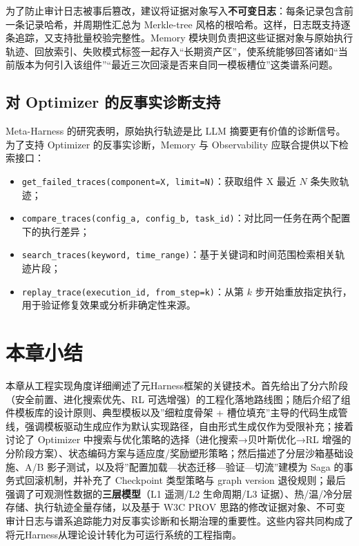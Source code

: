 为了防止审计日志被事后篡改，建议将证据对象写入\textbf{不可变日志}：每条记录包含前一条记录哈希，并周期性汇总为 Merkle-tree 风格的根哈希。这样，日志既支持逐条追踪，又支持批量校验完整性。Memory 模块则负责把这些证据对象与原始执行轨迹、回放索引、失败模式标签一起存入“长期资产区”，使系统能够回答诸如“当前版本为何引入该组件”“最近三次回滚是否来自同一模板槽位”这类谱系问题。

\subsection{对 Optimizer 的反事实诊断支持}

Meta-Harness 的研究表明，原始执行轨迹是比 LLM 摘要更有价值的诊断信号。为了支持 Optimizer 的反事实诊断，Memory 与 Observability 应联合提供以下检索接口：
\begin{itemize}
    \item \texttt{get\_failed\_traces(component=X, limit=N)}：获取组件 X 最近 $N$ 条失败轨迹；
    \item \texttt{compare\_traces(config\_a, config\_b, task\_id)}：对比同一任务在两个配置下的执行差异；
    \item \texttt{search\_traces(keyword, time\_range)}：基于关键词和时间范围检索相关轨迹片段；
    \item \texttt{replay\_trace(execution\_id, from\_step=k)}：从第 $k$ 步开始重放指定执行，用于验证修复效果或分析非确定性来源。
\end{itemize}

\section{本章小结}

本章从工程实现角度详细阐述了元Harness框架的关键技术。首先给出了分六阶段（安全前置、进化搜索优先、RL 可选增强）的工程化落地路线图；随后介绍了组件模板库的设计原则、典型模板以及”细粒度骨架 + 槽位填充”主导的代码生成管线，强调模板驱动生成应作为默认实现路径，自由形式生成仅作为受限补充；接着讨论了 Optimizer 中搜索与优化策略的选择（进化搜索→贝叶斯优化→RL 增强的分阶段方案）、状态编码方案与适应度/奖励塑形策略；然后描述了分层沙箱基础设施、A/B 影子测试，以及将”配置加载—状态迁移—验证—切流”建模为 Saga 的事务式回滚机制，并补充了 Checkpoint 类型策略与 graph version 退役规则；最后强调了可观测性数据的\textbf{三层模型}（L1 遥测/L2 生命周期/L3 证据）、热/温/冷分层存储、执行轨迹全量存储，以及基于 W3C PROV 思路的修改证据对象、不可变审计日志与谱系追踪能力对反事实诊断和长期治理的重要性。这些内容共同构成了将元Harness从理论设计转化为可运行系统的工程指南。
